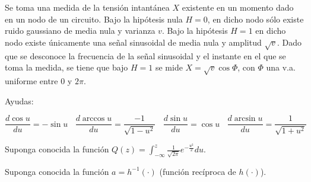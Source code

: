 \ifspanish

\question[25] %

Se toma una medida de la tensión intantánea $X$ existente en un momento dado en un nodo de un circuito. Bajo la hipótesis nula $H = 0$, en dicho nodo sólo existe ruido gaussiano de media nula y varianza $v$. Bajo la hipótesis $H=1$ en dicho nodo existe únicamente una señal sinusoidal de media nula y amplitud $\sqrt{v}$. Dado que se desconoce la frecuencia de la señal sinusoidal y el instante en el que se toma la medida, se tiene que bajo $H=1$ se mide $X =\sqrt{v} \cos \Phi$, con $\Phi$ una v.a. uniforme entre 0 y $2\pi$. 


Ayudas:

$$
\frac{d \cos u}{d u} = -\sin u  ~~~~ \frac{d \arccos u }{d u} = \frac{-1}{\sqrt{1-u^2}}~~~~\frac{d \sin u }{d u} = \cos u  ~~~~ \frac{d \arcsin u }{d u} = \frac{1}{\sqrt{1+u^2}}
$$

Suponga conocida la función $Q(z) = \int_{-\infty}^z \frac{1}{\sqrt{2\pi}} e^{-\frac{u^2}{2}} du $.

Suponga conocida la función $a = h^{-1}(\cdot)$ (función recíproca de $h(\cdot)$).


